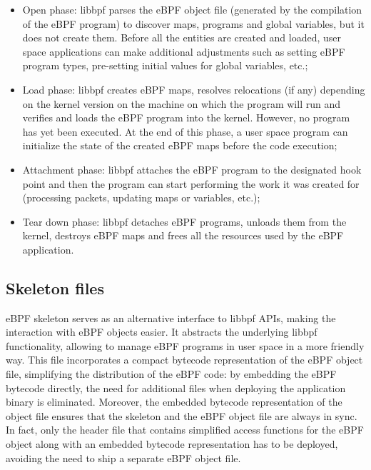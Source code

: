 \begin{itemize}
	\item 
		Open phase: libbpf parses the eBPF object file (generated by the compilation of the eBPF program) to discover maps, programs and global variables, but it does not create them.
		Before all the entities are created and loaded, user space applications can make additional adjustments such as setting eBPF program types, pre-setting initial values for global variables, etc.;
	\item 
		Load phase: libbpf creates eBPF maps, resolves relocations (if any) depending on the kernel version on the machine on which the program will run and verifies and loads the eBPF program into the kernel.
		However, no program has yet been executed.
		At the end of this phase, a user space program can initialize the state of the created eBPF maps before the code execution;
	\item 
		Attachment phase: libbpf attaches the eBPF program to the designated hook point and then the program can start performing the work it was created for (processing packets, updating maps or variables, etc.);
	\item 
		Tear down phase: libbpf detaches eBPF programs, unloads them from the kernel, destroys eBPF maps and frees all the resources used by the eBPF application.
\end{itemize}

\subsection{Skeleton files}

eBPF skeleton serves as an alternative interface to libbpf APIs, making the interaction with eBPF objects easier. 
It abstracts the underlying libbpf functionality, allowing to manage eBPF programs in user space in a more friendly way. 
This file incorporates a compact bytecode representation of the eBPF object file, simplifying the distribution of the eBPF code: by embedding the eBPF bytecode directly, the need for additional files when deploying the application binary is eliminated.
Moreover, the embedded bytecode representation of the object file ensures that the skeleton and the eBPF object file are always in sync.
In fact, only the header file that contains simplified access functions for the eBPF object along with an embedded bytecode representation has to be deployed, avoiding the need to ship a separate eBPF object file.

